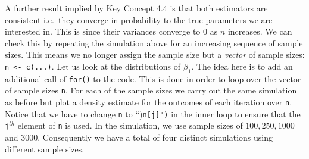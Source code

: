 \documentclass[]{book}
\theoremstyle{definition}
\theoremstyle{definition}
\theoremstyle{definition}
\theoremstyle{remark}
\begin{document}
A further result implied by Key Concept 4.4 is that both estimators are
consistent i.e.~they converge in probability to the true parameters we
are interested in. This is since their variances converge to \(0\) as
\(n\) increases. We can check this by repeating the simulation above for
an increasing sequence of sample sizes. This means we no longer assign
the sample size but a \emph{vector} of sample sizes:
\texttt{n <- c(...)}. Let us look at the distributions of \(\beta_1\).
The idea here is to add an additional call of \texttt{for()} to the
code. This is done in order to loop over the vector of sample sizes
\texttt{n}. For each of the sample sizes we carry out the same
simulation as before but plot a density estimate for the outcomes of
each iteration over \texttt{n}. Notice that we have to change \texttt{n}
to ``)\texttt{n{[}j{]}")} in the inner loop to ensure that the
\texttt{j}\(^{th}\) element of \texttt{n} is used. In the simulation, we
use sample sizes of \(100, 250, 1000\) and \(3000\). Consequently we
have a total of four distinct simulations using different sample sizes.
\end{document}
